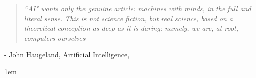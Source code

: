 \newcommand{\chapquote}[3]{\begin{quotation} \textit{#1} \end{quotation} \begin{flushright} - #2, \textit{#3}\end{flushright} }


\vspace*{\fill}
\chapquote{``AI" wants  only  the genuine article:  \textit{machines with minds},
in the full and literal sense. This is not science fiction,
but real science, based on a theoretical conception as deep as
it is daring: namely, we are, at root, \textit{computers ourselves}} {John Haugeland, Artificial Intelligence}
\vspace{1em}

\vspace*{\fill}